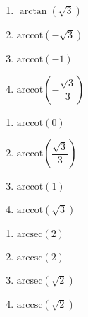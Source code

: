 \documentclass{ximera}
\begin{document}
\begin{multicols}{4}

\begin{enumerate}

\setcounter{enumi}{\value{HW}}

\item $\arctan \left( \sqrt{3} \right)$ 
\item $\mbox{arccot} \left( -\sqrt{3} \right)$ 
\item $\mbox{arccot} \left( -1 \right)$ 
\item $\mbox{arccot} \left( -\dfrac{\sqrt{3}}{3} \right)$

\setcounter{HW}{\value{enumi}}

\end{enumerate}

\end{multicols}

\begin{multicols}{4}

\begin{enumerate}

\setcounter{enumi}{\value{HW}}

\item $\mbox{arccot} \left( 0 \right)$ 
\item $\mbox{arccot} \left( \dfrac{\sqrt{3}}{3} \right)$
\item $\mbox{arccot} \left( 1 \right)$ 
\item $\mbox{arccot} \left( \sqrt{3} \right)$ 

\setcounter{HW}{\value{enumi}}

\end{enumerate}

\end{multicols}

\begin{multicols}{4}

\begin{enumerate}

\setcounter{enumi}{\value{HW}}

\item $\mbox{arcsec} \left( 2 \right)$
\item $\mbox{arccsc} \left( 2 \right)$
\item $\mbox{arcsec} \left( \sqrt{2} \right)$
\item $\mbox{arccsc} \left( \sqrt{2} \right)$

\setcounter{HW}{\value{enumi}}

\end{enumerate}

\end{multicols}
\end{document}
